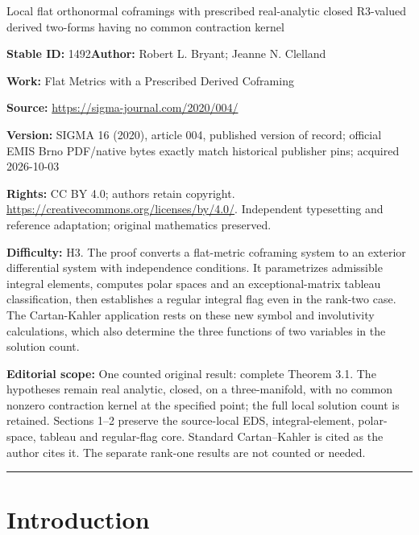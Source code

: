 \documentclass[11pt]{article}
\numberwithin{equation}{section}
\begin{document}
\begin{center}\Large Local flat orthonormal coframings with prescribed real-analytic closed R3-valued derived two-forms having no common contraction kernel\end{center}
\noindent\textbf{Stable ID:} 1492\quad\textbf{Author:} Robert L. Bryant; Jeanne N. Clelland\par
\noindent\textbf{Work:} Flat Metrics with a Prescribed Derived Coframing\par
\noindent\textbf{Source:} \url{https://sigma-journal.com/2020/004/}\par
\noindent\textbf{Version:} SIGMA 16 (2020), article 004, published version of record; official EMIS Brno PDF/native bytes exactly match historical publisher pins; acquired 2026-10-03\par
\noindent\textbf{Rights:} CC BY 4.0; authors retain copyright. \url{https://creativecommons.org/licenses/by/4.0/}. Independent typesetting and reference adaptation; original mathematics preserved.\par
\noindent\textbf{Difficulty:} H3. The proof converts a flat-metric coframing system to an exterior differential system with independence conditions. It parametrizes admissible integral elements, computes polar spaces and an exceptional-matrix tableau classification, then establishes a regular integral flag even in the rank-two case. The Cartan-Kahler application rests on these new symbol and involutivity calculations, which also determine the three functions of two variables in the solution count.\par
\medskip\noindent\textbf{Editorial scope:} One counted original result: complete Theorem 3.1. The hypotheses remain real analytic, closed, on a three-manifold, with no common nonzero contraction kernel at the specified point; the full local solution count is retained. Sections 1--2 preserve the source-local EDS, integral-element, polar-space, tableau and regular-flag core. Standard Cartan--Kahler is cited as the author cites it. The separate rank-one results are not counted or needed.\par
\medskip\hrule\medskip
\section{Introduction}\label{sec: intro}
\end{document}
